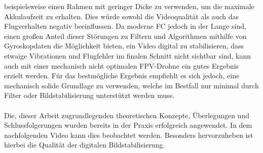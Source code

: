 beispielsweise einen Rahmen mit geringer Dicke zu verwenden, um die maximale Akkulaufzeit zu erhalten.
Dies würde sowohl die Videoqualität als auch das Flugverhalten negativ beeinflussen. Da moderne FC
jedoch in der Lange sind, einen großen Anteil dieser Störungen zu Filtern und Algorithmen mithilfe
von Gyroskopdaten die Möglichkeit bieten, ein Video digital zu stabilisieren, dass etwaige Vibrationen
und Flugfehler im finalen Schnitt nicht sichtbar sind, kann auch mit einer mechanisch nicht optimalen
FPV-Drohne ein gutes Ergebnis erzielt werden. Für das bestmögliche Ergebnis empfiehlt es sich jedoch,
eine mechanisch solide Grundlage zu verwenden, welche im Bestfall nur minimal durch Filter oder 
Bildstabilisierung unterstützt werden muss. \\
\\
Die, dieser Arbeit zugrundlegenden theoretischen Konzepte, Überlegungen und Schlussfolgerungen
wurden bereits in der Praxis erfolgreich angewendet. In dem nachfolgenden Video kann dies beobachtet
werden. Besonders hervorzuheben ist hierbei die Qualität der digitalen Bildstabilisierung.
